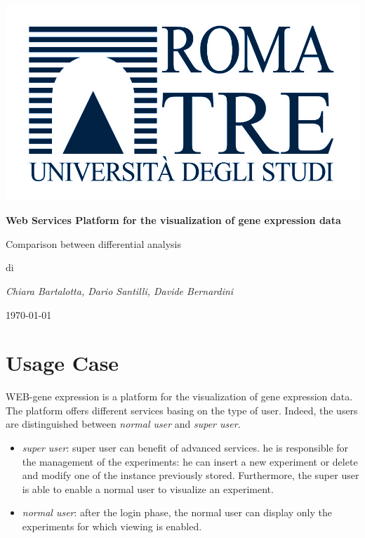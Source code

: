 \documentclass[a4paper]{report}
\begin{document}
\begin{titlepage}
\centering
{}
\includegraphics{logoRomaTre.jpg}\\
{\LARGE \bf Web Services Platform for the visualization of gene expression data\par}
\vspace{0.5cm}
{\Large Comparison between differential analysis\par} 
\vspace{2cm}
di\\
{\Large \em Chiara Bartalotta, Dario Santilli, Davide Bernardini\par}
\date{\currenttime}
\today
\end{titlepage}

\tableofcontents

\chapter{Usage Case}
WEB-gene expression is a platform for the visualization of gene expression data. The platform offers different services basing on the type of user. Indeed, the users are distinguished between \emph{normal user} and \emph{super user}.
\begin{itemize}
   \item \textit{super user}: super user can benefit of advanced services. he is responsible for the management of the experiments: he can insert a new experiment or delete and modify one of the instance previously stored. Furthermore, the super user is able to enable a normal user to visualize an experiment. 
   \item \textit{normal user}: after the login phase, the normal user can display only the experiments for which viewing is enabled.
\end{itemize}
\end{document}
